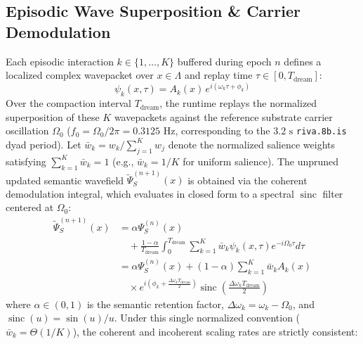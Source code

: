 \documentclass[10pt, twocolumn, a4paper]{article}
\begin{document}
\subsection{Episodic Wave Superposition \& Carrier Demodulation}
Each episodic interaction $k \in \{1, \dots, K\}$ buffered during epoch $n$ defines a localized complex wavepacket over $x \in \Lambda$ and replay time $\tau \in [0, T_{\text{dream}}]$:
\begin{equation}
\psi_k(x, \tau) = A_k(x) \, e^{i(\omega_k \tau + \phi_k)}
\label{eq:wavepacket}
\end{equation}
Over the compaction interval $T_{\text{dream}}$, the runtime replays the normalized superposition of these $K$ wavepackets against the reference substrate carrier oscillation $\Omega_0$ ($f_0 = \Omega_0 / 2\pi = 0.3125\text{ Hz}$, corresponding to the $3.2\text{ s}$ \texttt{riva.8b.is} dyad period). Let $\bar{w}_k = w_k / \sum_{j=1}^K w_j$ denote the normalized salience weights satisfying $\sum_{k=1}^K \bar{w}_k = 1$ (e.g., $\bar{w}_k = 1/K$ for uniform salience). The unpruned updated semantic wavefield $\widetilde{\Psi}_S^{(n+1)}(x)$ is obtained via the coherent demodulation integral, which evaluates in closed form to a spectral $\operatorname{sinc}$ filter centered at $\Omega_0$:
\begin{equation}
\begin{split}
\widetilde{\Psi}_S^{(n+1)}(x) &= \alpha \Psi_S^{(n)}(x) \\
&\quad + \frac{1 - \alpha}{T_{\text{dream}}} \int_{0}^{T_{\text{dream}}} \sum_{k=1}^{K} \bar{w}_k \psi_k(x, \tau) e^{-i \Omega_0 \tau} d\tau \\
&= \alpha \Psi_S^{(n)}(x) + (1 - \alpha) \sum_{k=1}^{K} \bar{w}_k A_k(x) \\
&\quad \times e^{i\left(\phi_k + \frac{\Delta\omega_k T_{\text{dream}}}{2}\right)} \operatorname{sinc}\!\left(\frac{\Delta\omega_k T_{\text{dream}}}{2}\right)
\end{split}
\label{eq:demodulation}
\end{equation}
where $\alpha \in (0, 1)$ is the semantic retention factor, $\Delta\omega_k = \omega_k - \Omega_0$, and $\operatorname{sinc}(u) = \sin(u)/u$. Under this single normalized convention ($\bar{w}_k = \Theta(1/K)$), the coherent and incoherent scaling rates are strictly consistent:
\end{document}
